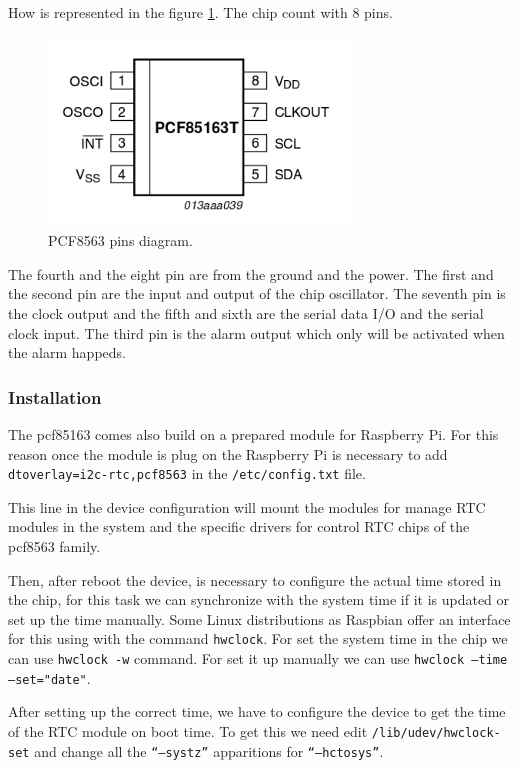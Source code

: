 			How is represented in the figure \ref{fig:pcf8563-pins}. The chip count with 8 pins.

			\begin{figure}[h!]
			\includegraphics[width=8cm]{fig/pcf85163t.png}
			\centering
			\caption{PCF8563 pins diagram.\label{fig:pcf8563-pins}}
			\end{figure}

			The fourth and the eight pin are from the ground and the power. The first and the second pin are the input and output of the chip oscillator. The seventh pin is the clock output and the fifth and sixth are the serial data I/O and the serial clock input. The third pin is the alarm output which only will be activated when the alarm happeds.

			\subsubsection{Installation}
			The pcf85163 comes also build on a prepared module for Raspberry Pi. For this reason once the module is plug on the Raspberry Pi is necessary to add \texttt{dtoverlay=i2c-rtc,pcf8563} in the \texttt{/etc/config.txt} file.

			This line in the device configuration will mount the modules for manage RTC modules in the system and the specific drivers for control RTC chips of the pcf8563 family.

			Then, after reboot the device, is necessary to configure the actual time stored in the chip, for this task we can synchronize with the system time if it is updated or set up the time manually. Some Linux distributions as Raspbian offer an interface for this using with the command \texttt{hwclock}. For set the system time in the chip we can use \texttt{hwclock -w} command. For set it up manually we can use \texttt{hwclock --time --set="date"}.

			After setting up the correct time, we have to configure the device to get the time of the RTC module on boot time. To get this we need edit \texttt{/lib/udev/hwclock-set} and change all the \texttt{``--systz''} apparitions for \texttt{``--hctosys''}.

